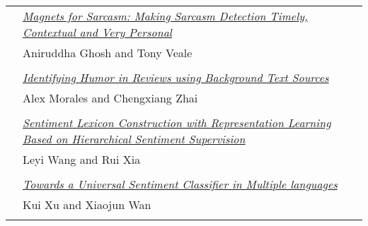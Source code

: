 \begin{tabular}{p{20mm}p{128mm}}
 & \hyperlink{page.491}{\em Magnets for Sarcasm: Making Sarcasm Detection Timely, Contextual and Very Personal}\\
         & Aniruddha Ghosh and Tony Veale \\
\\

 & \hyperlink{page.501}{\em Identifying Humor in Reviews using Background Text Sources}\\
         & Alex Morales and Chengxiang Zhai \\
\\

 & \hyperlink{page.511}{\em Sentiment Lexicon Construction with Representation Learning Based on Hierarchical Sentiment Supervision}\\
         & Leyi Wang and Rui Xia \\
\\

 & \hyperlink{page.520}{\em Towards a Universal Sentiment Classifier in Multiple languages}\\
         & Kui Xu and Xiaojun Wan \\
\\

\end{tabular}
\newpage
